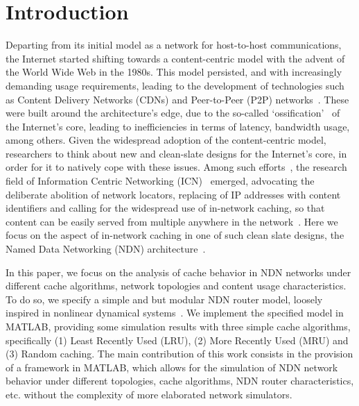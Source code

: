 \section{Introduction}
\label{sec:intro}

Departing from its initial model as a network for host-to-host communications, 
the Internet started shifting towards a content-centric model with the advent of 
the World Wide Web in the 1980s. This model persisted, 
and with increasingly demanding usage requirements, leading to the 
development of technologies such as 
Content Delivery Networks (CDNs) and Peer-to-Peer (P2P) 
networks~\cite{Passarella20121}. These were built around the architecture's 
edge, due to the so-called 
`ossification'~\cite{Handley:2006:WIO:1188052.1188101} of the Internet's core, 
leading to inefficiencies in terms of latency, bandwidth usage, among others. 
Given the widespread adoption of the content-centric model, 
researchers to think about new and clean-slate designs 
for the Internet's core, in order for it to natively cope with these issues. Among 
such efforts~\cite{5936152}, the research field of Information Centric Networking 
(ICN)~\cite{Xylomenos2013} emerged, 
advocating the deliberate abolition of network locators, replacing of IP 
addresses with content identifiers and calling for the widespread use of 
in-network caching, so that content can be easily served from multiple 
anywhere in the network~\cite{Koponen2007,Jacobson2009,Trossen2012,
Raychaudhuri2012,Han2012,Dannewitz:2013:NII:2459510.2459643}. Here we focus on the aspect of 
in-network caching in one of such clean slate designs, 
the Named Data Networking (NDN) architecture~\cite{Jacobson2009}.\shortvertbreak

In this paper, we focus on the analysis of cache behavior in NDN 
networks under different cache algorithms, network topologies and content 
usage characteristics. To do so, we specify a simple and but modular NDN router 
model, loosely inspired in nonlinear dynamical 
systems~\cite{Hedrick2010}. We implement the specified model in MATLAB\textsuperscript{\textregistered}, providing 
some simulation results with three simple cache algorithms, specifically (1) Least Recently 
Used (LRU), (2) More Recently Used (MRU) and (3) Random caching. The main contribution 
of this work consists in the provision of a framework in MATLAB\textsuperscript{\textregistered}, 
which allows for the simulation of NDN network behavior under different 
topologies, cache algorithms, NDN router characteristics, etc. without 
the complexity of more elaborated network simulators.\shortvertbreak

